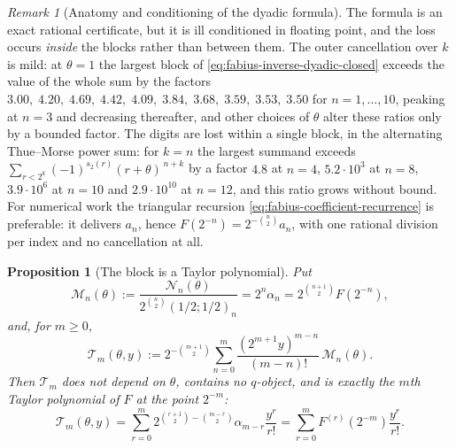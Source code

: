 \documentclass[11pt,oneside,openany]{book}
\newtheorem{proposition}[proposition]{Proposition}
\theoremstyle{definition}
\theoremstyle{remark}
\newtheorem{remark}[remark]{Remark}
\begin{document}
\begin{remark}[Anatomy and conditioning of the dyadic formula]
The formula is an exact rational certificate, but it is ill conditioned in floating
point, and the loss occurs \emph{inside} the blocks rather than between them.  The outer
cancellation over $k$ is mild: at $\theta=1$ the largest block of
\eqref{eq:fabius-inverse-dyadic-closed} exceeds the value of the whole sum by the factors
$3.00,\;4.20,\;4.69,\;4.42,\;4.09,\;3.84,\;3.68,\;3.59,\;3.53,\;3.50$ for
$n=1,\ldots,10$, peaking at $n=3$ and decreasing thereafter, and other choices of
$\theta$ alter these ratios only by a bounded factor.  The digits are lost within a
single block, in the alternating Thue--Morse power sum: for $k=n$ the largest summand
exceeds $\sum_{r<2^{k}}(-1)^{s_2(r)}(r+\theta)^{\,n+k}$ by a factor $4.8$ at $n=4$,
$5.2\cdot10^{3}$ at $n=8$, $3.9\cdot10^{6}$ at $n=10$ and $2.9\cdot10^{10}$ at $n=12$,
and this ratio grows without bound.  For numerical work the triangular recursion
\eqref{eq:fabius-coefficient-recurrence} is preferable: it delivers $a_n$, hence
$F(2^{-n})=2^{-\binom n2}a_n$, with one rational division per index and no cancellation
at all.
\end{remark}

\begin{proposition}[The block is a Taylor polynomial]\label{prop:dyadic-taylor-reduction}
Put
\begin{equation}\label{eq:dyadic-normalized-block}
 \mathcal M_n(\theta):=\frac{\mathcal N_n(\theta)}{2^{\binom n2}(1/2;1/2)_n}
 =2^n\alpha_n=2^{\binom{n+1}{2}}F(2^{-n}),
\end{equation}
and, for $m\ge0$,
\begin{equation}\label{eq:dyadic-taylor-assembly}
 \mathcal T_m(\theta,y)
 :=2^{-\binom{m+1}{2}}\sum_{n=0}^{m}
   \frac{(2^{m+1}y)^{m-n}}{(m-n)!}\,\mathcal M_n(\theta).
\end{equation}
Then $\mathcal T_m$ does not depend on $\theta$, contains no $q$-object, and is exactly
the $m$th Taylor polynomial of $F$ at the point $2^{-m}$:
\begin{equation}\label{eq:dyadic-taylor-identification}
 \mathcal T_m(\theta,y)
 =\sum_{r=0}^{m}2^{\binom{r+1}{2}-\binom{m-r}{2}}\alpha_{m-r}\frac{y^r}{r!}
 =\sum_{r=0}^{m}F^{(r)}(2^{-m})\frac{y^r}{r!}.
\end{equation}
\end{proposition}
\end{document}
